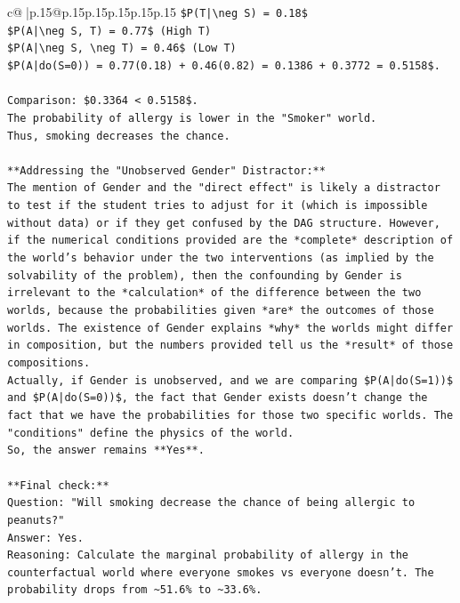 \documentclass{article}
\begin{document}
{\begin{supertabular}{c@{$\;$}|p{.15\linewidth}@{}p{.15\linewidth}p{.15\linewidth}p{.15\linewidth}p{.15\linewidth}p{.15\linewidth}}
{{{\texttt{\$P(T|\textbackslash{}neg S) = 0.18\$} \\
\texttt{\$P(A|\textbackslash{}neg S, T) = 0.77\$ (High T)} \\
\texttt{\$P(A|\textbackslash{}neg S, \textbackslash{}neg T) = 0.46\$ (Low T)} \\
\texttt{\$P(A|do(S=0)) = 0.77(0.18) + 0.46(0.82) = 0.1386 + 0.3772 = 0.5158\$.} \\
\\ 
\texttt{Comparison: \$0.3364 < 0.5158\$.} \\
\texttt{The probability of allergy is lower in the "Smoker" world.} \\
\texttt{Thus, smoking decreases the chance.} \\
\\ 
\texttt{**Addressing the "Unobserved Gender" Distractor:**} \\
\texttt{The mention of Gender and the "direct effect" is likely a distractor to test if the student tries to adjust for it (which is impossible without data) or if they get confused by the DAG structure. However, if the numerical conditions provided are the *complete* description of the world's behavior under the two interventions (as implied by the solvability of the problem), then the confounding by Gender is irrelevant to the *calculation* of the difference between the two worlds, because the probabilities given *are* the outcomes of those worlds. The existence of Gender explains *why* the worlds might differ in composition, but the numbers provided tell us the *result* of those compositions.} \\
\texttt{Actually, if Gender is unobserved, and we are comparing \$P(A|do(S=1))\$ and \$P(A|do(S=0))\$, the fact that Gender exists doesn't change the fact that we have the probabilities for those two specific worlds. The "conditions" define the physics of the world.} \\
\texttt{So, the answer remains **Yes**.} \\
\\ 
\texttt{**Final check:**} \\
\texttt{Question: "Will smoking decrease the chance of being allergic to peanuts?"} \\
\texttt{Answer: Yes.} \\
\texttt{Reasoning: Calculate the marginal probability of allergy in the counterfactual world where everyone smokes vs everyone doesn't. The probability drops from \textasciitilde{}51.6\% to \textasciitilde{}33.6\%.} \\
}}}
\end{supertabular}}
\end{document}

